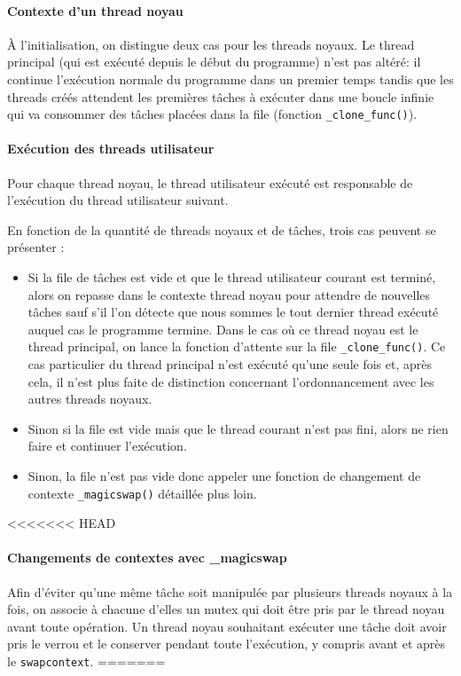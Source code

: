 \paragraph{Contexte d'un thread noyau} À l'initialisation, on distingue deux cas pour les threads noyaux. Le thread principal (qui est exécuté depuis le début du programme) n'est pas altéré: il continue l'exécution normale du programme dans un premier temps tandis que les threads créés attendent les premières tâches à exécuter dans une boucle infinie qui va consommer des tâches placées dans la file (fonction \verb!_clone_func()!).

\paragraph{Exécution des threads utilisateur} Pour chaque thread noyau, le thread utilisateur exécuté est responsable de l'exécution du thread utilisateur suivant. 

En fonction de la quantité de threads noyaux et de tâches, trois cas peuvent se présenter :
\begin{itemize}
	\item Si la file de tâches est vide et que le thread utilisateur courant est terminé, alors on repasse dans le contexte thread noyau pour attendre de nouvelles tâches sauf s'il l'on détecte que nous sommes le tout dernier thread exécuté auquel cas le programme termine. Dans le cas où ce thread noyau est le thread principal, on lance la fonction d'attente sur la file \verb!_clone_func()!. Ce cas particulier du thread principal n'est exécuté qu'une seule fois et, après cela, il n'est plus faite de distinction concernant l'ordonnancement avec les autres threads noyaux.
\item Sinon si la file est vide mais que le thread courant n'est pas fini, alors ne rien faire et continuer l'exécution.
\item Sinon, la file n'est pas vide donc appeler une fonction de changement de contexte \verb!_magicswap()! détaillée plus loin.
\end{itemize}

<<<<<<< HEAD
\paragraph{Changements de contextes avec \_magicswap} Afin d'éviter qu'une même tâche soit manipulée par plusieurs threads noyaux à la fois, on associe à chacune d'elles un mutex qui doit être pris par le thread noyau avant toute opération. Un thread noyau souhaitant exécuter une tâche doit avoir pris le verrou et le conserver pendant toute l'exécution, y compris avant et après le \verb!swapcontext!.
=======
